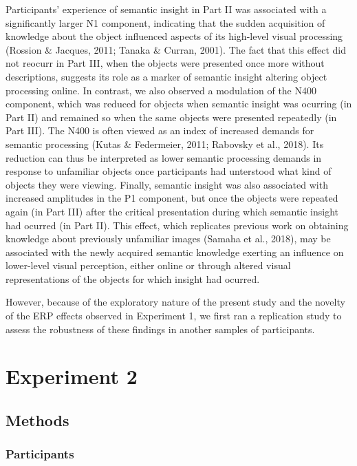 \documentclass[
  english,
  man,11pt,floatsintext]{apa7}
\begin{document}
Participants' experience of semantic insight in Part II was associated with a significantly larger N1 component, indicating that the sudden acquisition of knowledge about the object influenced aspects of its high-level visual processing (Rossion \& Jacques, 2011; Tanaka \& Curran, 2001). The fact that this effect did not reocurr in Part III, when the objects were presented once more without descriptions, suggests its role as a marker of semantic insight altering object processing online. In contrast, we also observed a modulation of the N400 component, which was reduced for objects when semantic insight was ocurring (in Part II) and remained so when the same objects were presented repeatedly (in Part III). The N400 is often viewed as an index of increased demands for semantic processing (Kutas \& Federmeier, 2011; Rabovsky et al., 2018). Its reduction can thus be interpreted as lower semantic processing demands in response to unfamiliar objects once participants had unterstood what kind of objects they were viewing. Finally, semantic insight was also associated with increased amplitudes in the P1 component, but once the objects were repeated again (in Part III) after the critical presentation during which semantic insight had ocurred (in Part II). This effect, which replicates previous work on obtaining knowledge about previously unfamiliar images (Samaha et al., 2018), may be associated with the newly acquired semantic knowledge exerting an influence on lower-level visual perception, either online or through altered visual representations of the objects for which insight had ocurred.

However, because of the exploratory nature of the present study and the novelty of the ERP effects observed in Experiment 1, we first ran a replication study to assess the robustness of these findings in another samples of participants.

\hypertarget{experiment-2}{%
\section{Experiment 2}\label{experiment-2}}

\hypertarget{methods-1}{%
\subsection{Methods}\label{methods-1}}

\hypertarget{participants-1}{%
\subsubsection{Participants}\label{participants-1}}
\end{document}
